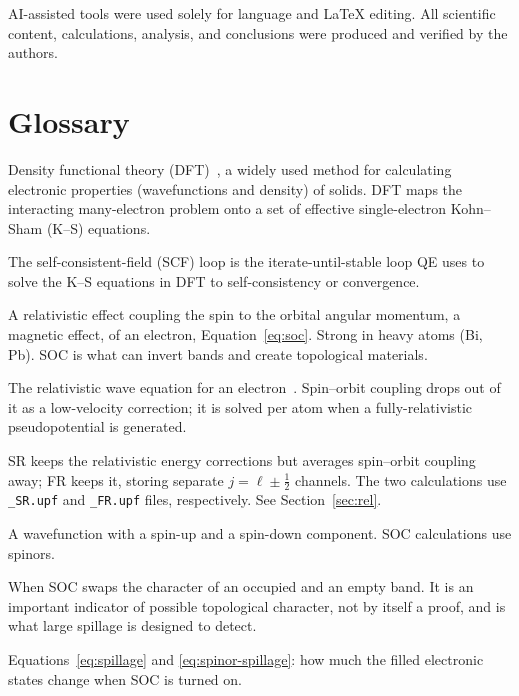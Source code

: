 \documentclass[11pt]{article}
\newcommand{\kk}{\mathbf{k}}
\begin{document}
AI-assisted tools were used solely for language and \LaTeX{} editing. All scientific content,
calculations, analysis, and conclusions were produced and verified by the authors.

\section*{Glossary}
\begin{description}[leftmargin=0em,style=nextline,itemsep=2pt]
\item[DFT / Kohn--Sham (K--S)] Density functional theory (DFT)~\cite{kohn1965}, a widely used method
for calculating electronic properties (wavefunctions and density) of solids. DFT maps the interacting
many-electron problem onto a set of effective single-electron Kohn--Sham (K--S) equations.
\item[SCF] The self-consistent-field (SCF) loop is the iterate-until-stable loop QE uses to solve the
K--S equations in DFT to self-consistency or convergence.
\item[Spin--orbit coupling (SOC)] A relativistic effect coupling the spin to the orbital angular
momentum, a magnetic effect, of an electron, Equation~\eqref{eq:soc}. Strong in heavy atoms (Bi, Pb).
SOC is what can invert bands and create
topological materials.
\item[Dirac equation] The relativistic wave equation for an electron~\cite{dirac1928}. Spin--orbit
coupling drops out of it as a low-velocity correction; it is solved per atom when a fully-relativistic
pseudopotential is generated.
\item[Scalar- vs fully-relativistic (SR / FR)] SR keeps the relativistic energy corrections but
averages spin--orbit coupling away; FR keeps it, storing separate $j=\ell\pm\frac12$ channels.
The two calculations use \texttt{\_SR.upf} and \texttt{\_FR.upf} files, respectively. See
Section~\ref{sec:rel}.
\item[Spinor] A wavefunction with a spin-up and a spin-down component. SOC calculations use spinors.
\item[Band inversion] When SOC swaps the character of an occupied and an empty band. It is an
important indicator of possible topological character, not by itself a proof, and is what large
spillage is designed to detect.
\item[Spillage $\gamma(\kk)$, $\eta$] Equations~\eqref{eq:spillage} and
\eqref{eq:spinor-spillage}: how much the filled electronic states change when SOC is turned on.

\end{description}
\end{document}
